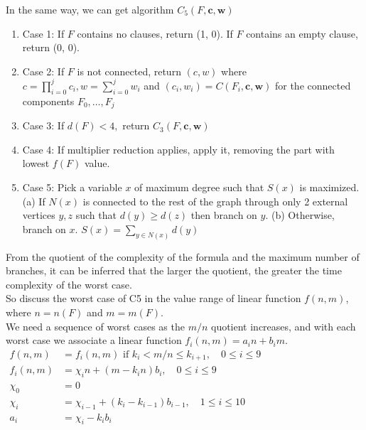 \documentclass{sigchi}
\begin{document}
In the same way, we can get	algorithm $C_{5}(F, \mathbf{c}, \mathbf{w})$
\begin{enumerate}
	\item Case 1: If $F$ contains no clauses, return (1, 0). If $F$ contains an empty clause, return (0, 0).
	\item Case 2: If $F$ is not connected, return $(c, w)$ where $c=\prod_{i=0}^{j} c_{i}, w=\sum_{i=0}^{j} w_{i}$ and $\left(c_{i}, w_{i}\right)=C\left(F_{i}, \mathbf{c}, \mathbf{w}\right)$ for the connected components $F_{0}, \ldots, F_{j}$
	\item Case 3: If $d(F)<4,$ return $C_{3}(F, \mathbf{c}, \mathbf{w})$ 
	\item Case 4: If multiplier reduction applies, apply it, removing the part with lowest $f(F)$ value.
	\item Case 5: Pick a variable $x$ of maximum degree such that $S(x)$ is maximized. (a) If $N(x)$ is connected to the rest of the graph through only 2 external vertices $y, z$ such that $d(y) \geqslant d(z)$ then branch on $y .$
	(b) Otherwise, branch on $x .$
	$S(x)=\sum_{y \in N(x)} d(y)$
\end{enumerate}
From the quotient of the complexity of the formula and the maximum number of branches, it can be inferred that the larger the quotient, the greater the time complexity of the worst case.\\So discuss the worst case of C5 in the value range of linear function $f\left(n,m\right)$, where $n=n(F)$ and $m=m(F)$. \\
We need a sequence of worst cases as the $m / n$ quotient increases, and with each worst case we associate a linear function $f_{i}(n, m)=a_{i} n+b_{i} m$. \\
$\begin{aligned} f(n, m) &=f_{i}(n, m) \text { if } k_{i}<m / n \leqslant k_{i+1}, \quad 0 \leqslant i \leqslant 9 \\ f_{i}(n, m) &=\chi_{i} n+\left(m-k_{i} n\right) b_{i}, \quad 0 \leqslant i \leqslant 9 \\ \chi_{0} &=0 \\ \chi_{i} &=\chi_{i-1}+\left(k_{i}-k_{i-1}\right) b_{i-1}, \quad 1 \leqslant i \leqslant 10 \\ a_{i} &=\chi_{i}-k_{i} b_{i} \end{aligned}$\\
\end{document}
